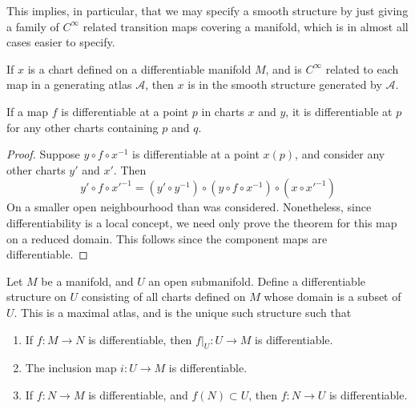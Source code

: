 This implies, in particular, that we may specify a smooth structure by just giving a family of $C^\infty$ related transition maps covering a manifold, which is in almost all cases easier to specify.

\begin{corollary}
    If $x$ is a chart defined on a differentiable manifold $M$, and is $C^\infty$ related to each map in a generating atlas $\mathcal{A}$, then $x$ is in the smooth structure generated by $\mathcal{A}$.
\end{corollary}

\begin{lemma}
    If a map $f$ is differentiable at a point $p$ in charts $x$ and $y$, it is differentiable at $p$ for any other charts containing $p$ and $q$.
\end{lemma}
\begin{proof}
    Suppose $y \circ f \circ x^{-1}$ is differentiable at a point $x(p)$, and consider any other charts $y'$ and $x'$. Then
    \[ y' \circ f \circ x'^{-1} = (y' \circ y^{-1}) \circ (y \circ f \circ x^{-1}) \circ (x \circ x'^{-1}) \]
    On a smaller open neighbourhood than was considered. Nonetheless, since differentiability is a local concept, we need only prove the theorem for this map on a reduced domain. This follows since the component maps are differentiable.
\end{proof}

\begin{example}
    Let $M$ be a manifold, and $U$ an open submanifold. Define a differentiable structure on $U$ consisting of all charts defined on $M$ whose domain is a subset of $U$. This is a maximal atlas, and is the unique such structure such that
    \begin{enumerate}
        \item If $f: M \to N$ is differentiable, then $f|_U: U \to M$ is differentiable.
        \item The inclusion map $i:U \to M$ is differentiable.
        \item If $f: N \to M$ is differentiable, and $f(N) \subset U$, then $f: N \to U$ is differentiable.
    \end{enumerate}
\end{example}

